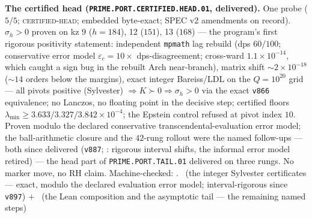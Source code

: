 \documentclass[11pt,a4paper]{article}
\theoremstyle{definition}
\begin{document}
\par\smallskip\noindent\textbf{The certified head
(\texttt{PRIME.PORT.CERTIFIED.\allowbreak HEAD.01},
delivered).}
One probe ($5/5$; \textsc{certified-head}; embedded byte-exact;
SPEC v2 amendments on record).  $\sigma_h > 0$ proven on kz 9
($h = 184$), 12 ($151$), 13 ($168$) --- the program's first
rigorous positivity statement: independent \texttt{mpmath} lag
rebuild (dps $60/100$; conservative error model $\varepsilon_c =
10\times$ dps-disagreement; cross-ward $1.1\times10^{-14}$,
which caught a sign bug in the rebuilt Arch near-branch), matrix
shift ${\sim}2\times10^{-18}$ (${\sim}14$ orders below the
margins), exact integer Bareiss/LDL on the $Q = 10^{20}$ grid
--- all pivots positive (Sylvester) $\Rightarrow K \succ 0
\Rightarrow \sigma_h > 0$ via the exact \texttt{v866}
equivalence; no Lanczos, no floating point in the decisive step;
certified floors $\lambda_{\min} \ge
3.633/3.327/3.842\times10^{-4}$; the Epstein control refused at
pivot index $10$.  Proven modulo the declared conservative
transcendental-evaluation error model; the ball-arithmetic
closure and the $42$-rung rollout were the named follow-ups ---
both since delivered (\texttt{v887};
: rigorous interval
shifts, the informal error model retired) --- the
head part of \texttt{PRIME.PORT.TAIL.01} delivered on three
rungs.  No marker move, no RH claim.
Machine-checked: .
\mE\ (the integer Sylvester certificates --- exact, modulo the
declared evaluation error model; interval-rigorous since
\texttt{v897}) $+$ \mO\ (the Lean composition and the asymptotic
tail --- the remaining named steps)
\par\smallskip
\end{document}
